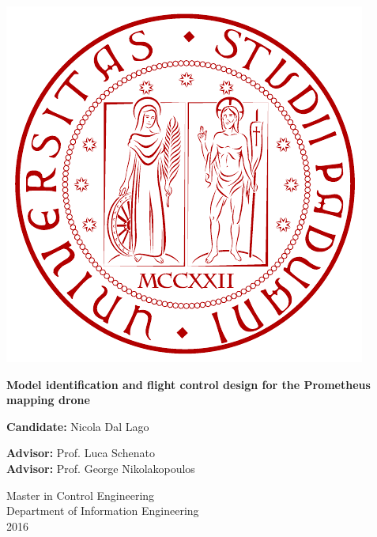 \documentclass[11pt, a4paper, onecolumn, fleqn, twoside, titlepage, openright]{book}
\begin{document}
	\renewcommand{\thepage}{\roman{page}} 		%

	\thispagestyle{empty}

	\begin{center}
	    \begin{minipage}{0.75\linewidth}
	        \centering
	        \includegraphics[width=0.5\linewidth]{images/logo_unipd.pdf}
	        \vspace{3cm}
	    
	        {\Large \textbf{Model identification and flight control design for the Prometheus mapping drone} \par}
	        \vspace{3cm}
	    
	        \hspace{5cm}
	        \textbf{Candidate:} Nicola Dal Lago
	        \vspace{3cm}

	        \justifying
	        \noindent
	        \hspace{-2cm}\textbf{Advisor:} Prof. Luca Schenato \\
	        \hspace*{-2cm}\textbf{Advisor:} Prof. George Nikolakopoulos
	        \vspace{3cm}

	        \centering
	        \noindent
	        Master in Control Engineering \\
	        Department of Information Engineering \\ 
	        2016
	        
	    \end{minipage}
	\end{center}
\end{document}

